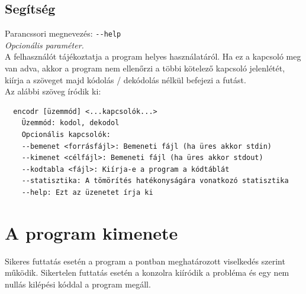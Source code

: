 \let\mypdfximage\pdfximage\def\pdfximage{\immediate\mypdfximage}\documentclass[twoside]{book}
\newcommand{\+}{\discretionary{\mbox{\scriptsize$\hookleftarrow$}}{}{}}
\newcommand{\clearemptydoublepage}{%
  \newpage{\pagestyle{empty}\cleardoublepage}%
}
\begin{document}
\subsection{Segítség}
Parancssori megnevezés: \texttt{-{}-help} \\
{\it Opcionális paraméter.}\\
A felhasználót tájékoztatja a program helyes használatáról. Ha ez a kapcsoló meg van adva, akkor a program nem ellenőrzi
a többi kötelező kapcsoló jelenlétét, kiírja a szöveget majd kódolás / dekódolás nélkül befejezi a futást.\\
Az alábbi szöveg íródik ki: \\
\begin{verbatim}    
  encodr [üzemmód] <...kapcsolók...>
    Üzemmód: kodol, dekodol
    Opcionális kapcsolók:
    --bemenet <forrásfájl>: Bemeneti fájl (ha üres akkor stdin)
    --kimenet <célfájl>: Bemeneti fájl (ha üres akkor stdout)
    --kodtabla <fájl>: Kiírja-e a program a kódtáblát
    --statisztika: A tömörítés hatékonyságára vonatkozó statisztika
    --help: Ezt az üzenetet írja ki
\end{verbatim}


\section{A program kimenete}
Sikeres futtatás esetén a program a  pontban meghatározott viselkedés szerint működik.
Sikertelen futtatás esetén a konzolra kiíródik a probléma és egy nem nullás kilépési kóddal a program megáll.


\backmatter

\end{document}
